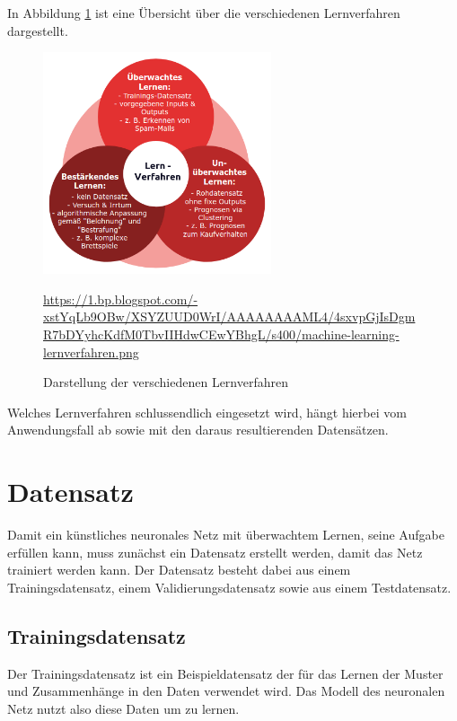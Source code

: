 In Abbildung \ref{overview-machine-learning-algorithms} ist eine Übersicht über die  verschiedenen Lernverfahren dargestellt.

\begin{figure}[H]
	\centering
	\includegraphics[width=0.6\textwidth]{kapitel3/images/lernverfahren.png}
	\caption{Darstellung der verschiedenen Lernverfahren}
	\label{overview-machine-learning-algorithms}
	\vspace{0.2cm}
	\quelle\url{https://1.bp.blogspot.com/-xstYqLb9OBw/XSYZUUD0WrI/AAAAAAAAML4/4sxvpGjIsDgmR7bDYyhcKdfM0TbvIIHdwCEwYBhgL/s400/machine-learning-lernverfahren.png}
\end{figure}

Welches Lernverfahren schlussendlich eingesetzt wird, hängt hierbei vom Anwendungsfall ab sowie mit den daraus resultierenden Datensätzen. 

\section{Datensatz}

Damit ein künstliches neuronales Netz mit überwachtem Lernen, seine Aufgabe erfüllen kann, muss zunächst ein Datensatz erstellt werden, damit das Netz trainiert werden kann. Der Datensatz besteht dabei aus einem Trainingsdatensatz, einem Validierungsdatensatz sowie aus einem Testdatensatz. \\

\subsection{Trainingsdatensatz}

Der Trainingsdatensatz ist ein Beispieldatensatz der für das Lernen der Muster und Zusammenhänge in den Daten verwendet wird. Das Modell des neuronalen Netz nutzt also diese Daten um zu lernen. \cite{datasolut} \\

